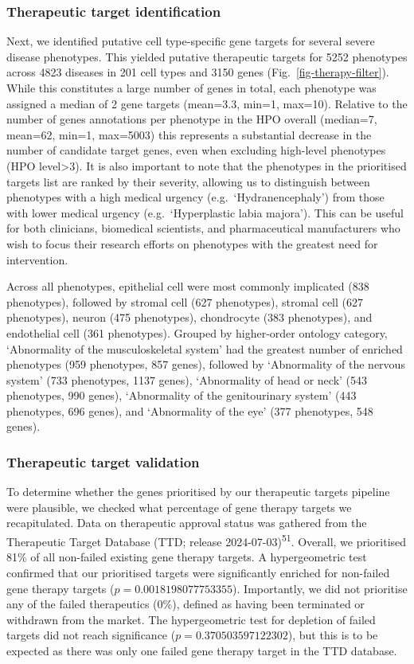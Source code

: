 \documentclass[
]{article}
\begin{document}
\subsubsection{Therapeutic target
identification}\label{therapeutic-target-identification}

Next, we identified putative cell type-specific gene targets for several
severe disease phenotypes. This yielded putative therapeutic targets for
5252 phenotypes across 4823 diseases in 201 cell types and 3150 genes
(Fig.~\ref{fig-therapy-filter}). While this constitutes a large number
of genes in total, each phenotype was assigned a median of 2 gene
targets (mean=3.3, min=1, max=10). Relative to the number of genes
annotations per phenotype in the HPO overall (median=7, mean=62, min=1,
max=5003) this represents a substantial decrease in the number of
candidate target genes, even when excluding high-level phenotypes (HPO
level\textgreater3). It is also important to note that the phenotypes in
the prioritised targets list are ranked by their severity, allowing us
to distinguish between phenotypes with a high medical urgency
(e.g.~`Hydranencephaly') from those with lower medical urgency
(e.g.~`Hyperplastic labia majora'). This can be useful for both
clinicians, biomedical scientists, and pharmaceutical manufacturers who
wish to focus their research efforts on phenotypes with the greatest
need for intervention.

Across all phenotypes, epithelial cell were most commonly implicated
(838 phenotypes), followed by stromal cell (627 phenotypes), stromal
cell (627 phenotypes), neuron (475 phenotypes), chondrocyte (383
phenotypes), and endothelial cell (361 phenotypes). Grouped by
higher-order ontology category, `Abnormality of the musculoskeletal
system' had the greatest number of enriched phenotypes (959 phenotypes,
857 genes), followed by `Abnormality of the nervous system' (733
phenotypes, 1137 genes), `Abnormality of head or neck' (543 phenotypes,
990 genes), `Abnormality of the genitourinary system' (443 phenotypes,
696 genes), and `Abnormality of the eye' (377 phenotypes, 548 genes).

\subsubsection{Therapeutic target
validation}\label{therapeutic-target-validation}

To determine whether the genes prioritised by our therapeutic targets
pipeline were plausible, we checked what percentage of gene therapy
targets we recapitulated. Data on therapeutic approval status was
gathered from the Therapeutic Target Database (TTD; release
2024-07-03)\textsuperscript{51}. Overall, we prioritised 81\% of all
non-failed existing gene therapy targets. A hypergeometric test
confirmed that our prioritised targets were significantly enriched for
non-failed gene therapy targets (\(p=0.0018198077753355\)). Importantly,
we did not prioritise any of the failed therapeutics (0\%), defined as
having been terminated or withdrawn from the market. The hypergeometric
test for depletion of failed targets did not reach significance
(\(p=0.370503597122302\)), but this is to be expected as there was only
one failed gene therapy target in the TTD database.
\end{document}
